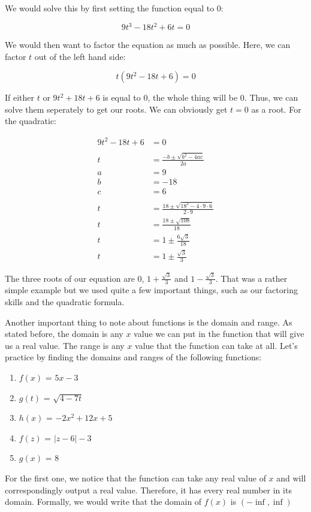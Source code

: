 \documentclass[12pt]{article}
\begin{document}
We would solve this by first setting the function equal to 0:

$$
    9t^3 - 18t^2 + 6t = 0
$$

We would then want to factor the equation as much as possible.
Here, we can factor $t$ out of the left hand side:

$$
    t(9t^2 - 18t + 6) = 0
$$

If either $t$ or $9t^2 + 18t + 6$ is equal to $0$, the whole thing will be $0$.
Thus, we can solve them seperately to get our roots.
We can obviously get $t=0$ as a root.
For the quadratic:

\begin{align*}
    9t^2 - 18t + 6 & = 0                                                \\
    \nonumber                                                           \\
    t              & = \frac{-b\pm\sqrt{b^2-4ac}}{2a}                   \\
    a              & = 9                                                \\
    b              & = -18                                              \\
    c              & = 6                                                \\
    \nonumber                                                           \\
    t              & = \frac{18 \pm \sqrt{18^2-4\cdot9\cdot6}}{2\cdot9} \\
    t              & = \frac{18 \pm \sqrt{108}}{18}                     \\
    t              & = 1 \pm \frac{6\sqrt{3}}{18}                       \\
    t              & = 1 \pm \frac{\sqrt{3}}{3}
\end{align*}

The three roots of our equation are $0$, $1 + \frac{\sqrt{3}}{3}$ and $1 - \frac{\sqrt{3}}{3}$.
That was a rather simple example but we used quite a few important things, such as our factoring skills and the quadratic formula.

Another important thing to note about functions is the domain and range.
As stated before, the domain is any $x$ value we can put in the function that will give us a real value.
The range is any $x$ value that the function can take at all.
Let's practice by finding the domains and ranges of the following functions:

\begin{enumerate}
    \item $f(x)$ = $5x-3$
    \item $g(t)$ = $\sqrt{4-7t}$
    \item $h(x)$ = $-2x^2+12x+5$
    \item $f(z)$ = $|z-6|-3$
    \item $g(x)$ = $8$
\end{enumerate}

For the first one, we notice that the function can take any real value of $x$ and will correspondingly output a real value.
Therefore, it has every real number in its domain. Formally, we would write that the domain of $f(x)$ is $(-\inf, \inf)$
\end{document}
